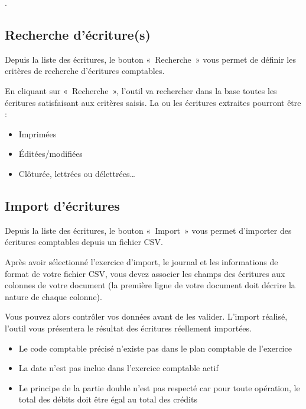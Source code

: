 \documentclass[a4paper,10pt,oneside,french]{sphinxmanual}
\begin{document}
.


\subsection{Recherche d’écriture(s)}
\label{\detokenize{accounting/entity:recherche-d-ecriture-s}}
Depuis la liste des écritures, le bouton « Recherche » vous permet de définir les critères de recherche d’écritures comptables.
\begin{quote}

\noindent{}
\end{quote}

En cliquant sur « Recherche », l’outil va rechercher dans la base toutes les écritures satisfaisant aux critères saisis.
La ou les écritures extraites pourront être :
\begin{itemize}
\item {} 
Imprimées

\item {} 
Éditées/modifiées

\item {} 
Clôturée, lettrées ou délettrées…

\end{itemize}


\subsection{Import d’écritures}
\label{\detokenize{accounting/entity:import-d-ecritures}}
Depuis la liste des écritures, le bouton « Import » vous permet d’importer des écritures comptables depuis un fichier CSV.

Après avoir sélectionné l’exercice d’import, le journal et les informations de format de votre fichier CSV, vous devez associer les champs des écritures aux colonnes de votre document (la première ligne de votre document doit décrire la nature de chaque colonne).
\begin{quote}

\noindent{}
\end{quote}

Vous pouvez alors contrôler vos données avant de les valider.
L’import réalisé, l’outil vous présentera le résultat des écritures réellement importées.

\begin{itemize}
\item {} 
Le code comptable précisé n’existe pas dans le plan comptable de l’exercice

\item {} 
La date n’est pas inclue dans l’exercice comptable actif

\item {} 
Le principe de la partie double n’est pas respecté car pour toute opération, le total des débits doit être égal au total des crédits

\end{itemize}
\end{document}
